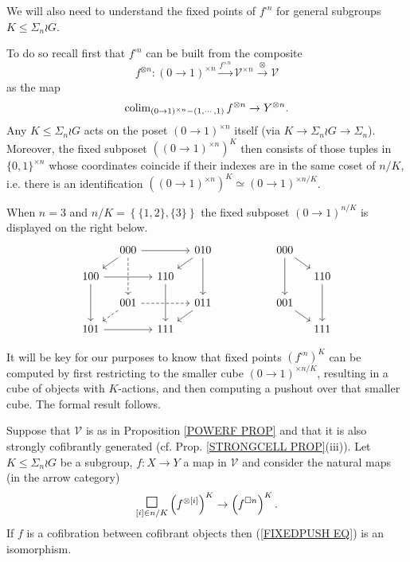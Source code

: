 \documentclass[a4paper,10pt]{article}%
\begin{document}
We will also need to understand the fixed points of $f^{\square n}$ for general subgroups $K \leq \Sigma_n \wr G$.

To do so recall first that $f^{\square n}$ can be built 
from the composite 
\[
f^{\otimes n} \colon 
(0\to 1)^{\times n}
\xrightarrow{f^{\times n}}
\mathcal{V}^{\times n}
\xrightarrow{\otimes}
\mathcal{V}
\]
as the map
\[
\operatorname{colim}_{(0 \to 1)^{\times n} - (1,\cdots,1)} f^{\otimes n}
\to 
Y^{\otimes n}.
\]
Any $K \leq \Sigma_n \wr G$ acts on the poset 
$(0 \to 1)^{\times n}$ itself 
(via $K \to \Sigma_n \wr G \to \Sigma_n$).
Moreover, the fixed subposet  
$\left((0 \to 1)^{\times n}\right)^K$
then consists of those tuples in $\{0,1\}^{\times n}$
whose coordinates coincide if their indexes are in the same coset of $n/K$, i.e. there is an identification
$\left((0 \to 1)^{\times n}\right)^K \simeq (0 \to 1)^{\times n/K}$.



\begin{example}
  When $n=3$ and $n/K = \left\{\{1,2\},\{3\}\right\}$ the fixed subposet $(0 \to 1)^{n/K}$ is displayed on the right below.
  \[
  \begin{tikzcd}[column sep=1em, row sep=1em]
    & 000 \ar{rr} \ar{ld} \ar[dashed]{dd} && 010 \ar{ld} \ar{dd}&
    &&&& 000 \ar{dd} \ar{rd}
    \\
    100 \ar{rr} \ar{dd} && 110 \ar{dd}&&
    &&&& & 110 \ar{dd}
    \\
    & 001 \ar[dashed]{rr} \ar[dashed]{ld} && 011 \ar{ld}&
    &&&& 001 \ar{rd}
    \\
    101 \ar{rr} && 111 &&
    &&&& & 111
  \end{tikzcd}
  \]
\end{example}


It will be key for our purposes to know that fixed points 
$\left( f^{\square n} \right)^K$ can be computed by first restricting to the smaller cube 
$(0 \to 1)^{\times n/K}$,
resulting in a cube of objects with $K$-actions,
and then computing a pushout over that smaller cube.
The formal result follows.



\begin{proposition}
  Suppose that $\mathcal{V}$ is as in Proposition \ref{POWERF PROP} and that it is also strongly cofibrantly generated (cf. Prop. \ref{STRONGCELL PROP}(iii)).
  Let $K \leq \Sigma_n \wr G$ be a subgroup, 
  $f \colon X \to Y$ a map in $\mathcal{V}$ and consider the natural maps (in the arrow category)
  \begin{equation}\label{FIXEDPUSH EQ}
    \underset{[i] \in n/K}{\mathlarger{\mathlarger{\square}}}
    \left( f^{\otimes [i]} \right)^K
    \to
    \left( f^{\square n} \right)^K.
  \end{equation}
  If $f$ is a cofibration between cofibrant objects then 
  (\ref{FIXEDPUSH EQ}) is an isomorphism.
\end{proposition}
\end{document}

